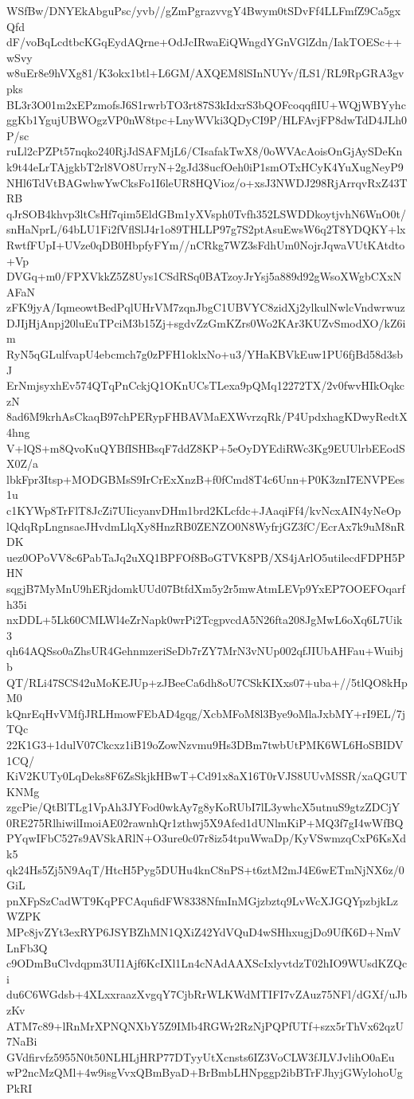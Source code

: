 WSfBw/DNYEkAbguPsc/yvb//gZmPgrazvvgY4Bwym0tSDvFf4LLFmfZ9Ca5gxQfd
dF/voBqLcdtbcKGqEydAQrne+OdJcIRwaEiQWngdYGnVGlZdn/IakTOESc++wSvy
w8uEr8e9hVXg81/K3okx1btl+L6GM/AXQEM8lSInNUYv/fLS1/RL9RpGRA3gvpks
BL3r3O01m2xEPzmofsJ6S1rwrbTO3rt87S3kIdxrS3bQOFcoqqflIU+WQjWBYyhc
ggKb1YgujUBWOgzVP0nW8tpc+LnyWVki3QDyCI9P/HLFAvjFP8dwTdD4JLh0P/sc
ruLl2cPZPt57nqko240RjJdSAFMjL6/CIsafakTwX8/0oWVAcAoisOnGjAySDeKn
k9t44eLrTAjgkbT2rl8VO8UrryN+2gJd38ucfOeh0iP1smOTxHCyK4YuXugNeyP9
NHl6TdVtBAGwhwYwCksFo1I6leUR8HQVioz/o+xsJ3NWDJ298RjArrqvRxZ43TRB
qJrSOB4khvp3ltCsHf7qim5EldGBm1yXVsph0Tvfh352LSWDDkoytjvhN6WnO0t/
snHaNprL/64bLU1Fi2fVflSlJ4r1o89THLLP97g7S2ptAsuEwsW6q2T8YDQKY+lx
RwtfFUpI+UVze0qDB0HbpfyFYm//nCRkg7WZ3sFdhUm0NojrJqwaVUtKAtdto+Vp
DVGq+m0/FPXVkkZ5Z8Uys1CSdRSq0BATzoyJrYsj5a889d92gWsoXWgbCXxNAFaN
zFK9jyA/IqmeowtBedPqlUHrVM7zqnJbgC1UBVYC8zidXj2ylkulNwlcVndwrwuz
DJIjHjAnpj20luEuTPciM3b15Zj+sgdvZzGmKZrs0Wo2KAr3KUZvSmodXO/kZ6im
RyN5qGLulfvapU4ebcmch7g0zPFH1oklxNo+u3/YHaKBVkEuw1PU6fjBd58d3sbJ
ErNmjsyxhEv574QTqPnCckjQ1OKnUCsTLexa9pQMq12272TX/2v0fwvHIkOqkczN
8ad6M9krhAsCkaqB97chPERypFHBAVMaEXWvrzqRk/P4UpdxhagKDwyRedtX4hng
V+lQS+m8QvoKuQYBfISHBsqF7ddZ8KP+5eOyDYEdiRWc3Kg9EUUlrbEEodSX0Z/a
lbkFpr3Itsp+MODGBMsS9IrCrExXnzB+f0fCmd8T4c6Unn+P0K3znI7ENVPEes1u
c1KYWp8TrFlT8JcZi7UIicyanvDHm1brd2KLcfdc+JAaqiFf4/kvNcxAIN4yNeOp
lQdqRpLngnsaeJHvdmLlqXy8HnzRB0ZENZO0N8WyfrjGZ3fC/EcrAx7k9uM8nRDK
uez0OPoVV8c6PabTaJq2uXQ1BPFOf8BoGTVK8PB/XS4jArlO5utilecdFDPH5PHN
sqgjB7MyMnU9hERjdomkUUd07BtfdXm5y2r5mwAtmLEVp9YxEP7OOEFOqarfh35i
nxDDL+5Lk60CMLWl4eZrNapk0wrPi2TcgpvcdA5N26fta208JgMwL6oXq6L7Uik3
qh64AQSso0aZhsUR4GehnmzeriSeDb7rZY7MrN3vNUp002qfJIUbAHFau+Wuibjb
QT/RLi47SCS42uMoKEJUp+zJBeeCa6dh8oU7CSkKIXxs07+uba+//5tlQO8kHpM0
kQnrEqHvVMfjJRLHmowFEbAD4gqg/XcbMFoM8l3Bye9oMlaJxbMY+rI9EL/7jTQc
22K1G3+1dulV07Ckcxz1iB19oZowNzvmu9Hs3DBm7twbUtPMK6WL6HoSBIDV1CQ/
KiV2KUTy0LqDeks8F6ZsSkjkHBwT+Cd91x8aX16T0rVJS8UUvMSSR/xaQGUTKNMg
zgcPie/QtBlTLg1VpAh3JYFod0wkAy7g8yKoRUbI7lL3ywhcX5utnuS9gtzZDCjY
0RE275RlhiwilImoiAE02rawnhQr1zthwj5X9Afed1dUNlmKiP+MQ3f7gI4wWfBQ
PYqwIFbC527s9AVSkARlN+O3ure0c07r8iz54tpuWwaDp/KyVSwmzqCxP6KsXdk5
qk24Hs5Zj5N9AqT/HtcH5Pyg5DUHu4knC8nPS+t6ztM2mJ4E6wETmNjNX6z/0GiL
pnXFpSzCadWT9KqPFCAqufidFW8338NfmInMGjzbztq9LvWcXJGQYpzbjkLzWZPK
MPc8jvZYt3exRYP6JSYBZhMN1QXiZ42YdVQuD4wSHhxugjDo9UfK6D+NmVLnFb3Q
c9ODmBuClvdqpm3UI1Ajf6KcIXl1Ln4cNAdAAXScIxlyvtdzT02hIO9WUsdKZQci
du6C6WGdsb+4XLxxraazXvgqY7CjbRrWLKWdMTIFI7vZAuz75NFl/dGXf/uJbzKv
ATM7c89+lRnMrXPNQNXbY5Z9IMb4RGWr2RzNjPQPfUTf+szx5rThVx62qzU7NaBi
GVdfirvfz5955N0t50NLHLjHRP77DTyyUtXcnsts6IZ3VoCLW3fJLVJvlihO0aEu
wP2ncMzQMl+4w9isgVvxQBmByaD+BrBmbLHNpggp2ibBTrFJhyjGWylohoUgPkRI
